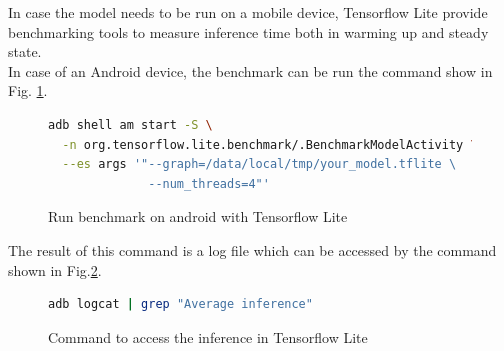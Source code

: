 In case the model needs to be run on a mobile device, Tensorflow Lite provide benchmarking tools to measure inference time both in warming up and steady state.\cite{tensorflow2015-whitepaper}\\ 
In case of an Android device, the benchmark can be run the command show in Fig. \ref{fig:bench_ten_lite_an}.\\
\begin{figure}[h]
\begin{lstlisting}[language=bash]
adb shell am start -S \
  -n org.tensorflow.lite.benchmark/.BenchmarkModelActivity \
  --es args '"--graph=/data/local/tmp/your_model.tflite \
              --num_threads=4"'
\end{lstlisting}
\caption[Run benchmark on android with Tensorflow Lite]{Run benchmark on android with Tensorflow Lite \cite{tensorflow2015-whitepaper}}
\label{fig:bench_ten_lite_an}
\end{figure}
The result of this command is a log file which can be accessed by the command shown in Fig.\ref{fig:inf_ten}.\\
\begin{figure}[h]
\begin{lstlisting}[language=bash]
adb logcat | grep "Average inference"
\end{lstlisting}
\caption[Command to access the inference in Tensorflow Lite]{Command to access the inference in Tensorflow Lite\cite{tensorflow2015-whitepaper}}
\label{fig:inf_ten}
\end{figure}



